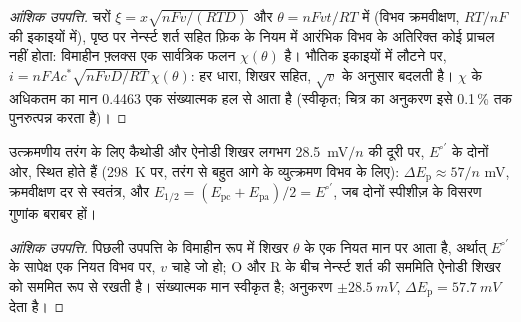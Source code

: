 \begin{proof}[आंशिक उपपत्ति]
चरों $\xi = x\sqrt{nFv/(RTD)}$ और $\theta = nFvt/RT$ में (विभव क्रमवीक्षण,
$RT/nF$ की इकाइयों में), पृष्ठ पर नेर्न्स्ट शर्त सहित फ़िक के नियम में आरंभिक विभव के अतिरिक्त
कोई प्राचल नहीं होता: विमाहीन फ़्लक्स एक
सार्वत्रिक फलन $\chi(\theta)$ है। भौतिक इकाइयों में लौटने पर, $i = nFAc^*\sqrt{nFvD/RT}\,\chi(\theta)$: हर
धारा, शिखर सहित, $\sqrt v$ के अनुसार बदलती है।
$\chi$ के अधिकतम का मान 0.4463 एक संख्यात्मक हल से आता है (स्वीकृत; चित्र का अनुकरण
इसे 0.1\,\% तक पुनरुत्पन्न करता है)।
\end{proof}

\begin{proposition}[शिखर पृथक्करण]\label{prop:b3:electrode-kinetics:delta-ep}
उत्क्रमणीय तरंग के लिए कैथोडी और ऐनोडी शिखर लगभग \qty{28.5}{mV}$/n$ की दूरी पर,
$E^{\circ\prime}$ के दोनों ओर, स्थित होते हैं (\qty{298}{K} पर, तरंग से बहुत आगे के व्युत्क्रमण विभव के लिए):
$\Delta E_{\mathrm p} \approx 57/n$ \unit{mV}, क्रमवीक्षण दर से स्वतंत्र, और $E_{1/2} = (E_{\mathrm{pc}} + E_{\mathrm{pa}})/2 =
E^{\circ\prime}$, जब दोनों स्पीशीज़ के विसरण गुणांक बराबर हों।
\end{proposition}

\begin{proof}[आंशिक उपपत्ति]
पिछली उपपत्ति के विमाहीन रूप में शिखर $\theta$ के एक नियत
मान पर आता है, अर्थात् $E^{\circ\prime}$ के सापेक्ष एक नियत विभव पर, $v$ चाहे जो हो;
O और R के बीच नेर्न्स्ट शर्त की सममिति ऐनोडी शिखर को
सममित रूप से रखती है। संख्यात्मक मान स्वीकृत है; अनुकरण
$\pm\qty{28.5}{mV}$, $\Delta E_{\mathrm p} = \qty{57.7}{mV}$ देता है।
\end{proof}

